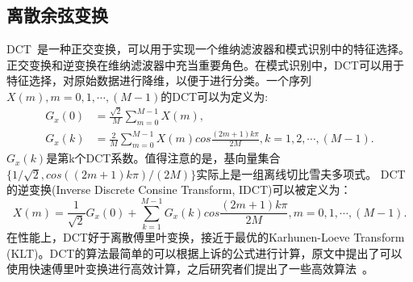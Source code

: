 \subsection{离散余弦变换}
DCT~\cite{ahmed1974discrete}是一种正交变换，可以用于实现一个维纳滤波器和模式识别中的特征选择。正交变换和逆变换在维纳滤波器中充当重要角色。在模式识别中，DCT可以用于特征选择，对原始数据进行降维，以便于进行分类。一个序列$X(m),m=0,1,\cdots,(M-1)$的DCT可以为定义为:
\begin{equation}
\label{equ:dct}
\begin{aligned}
G_{x}\left( 0\right) &= \frac{\sqrt{2}}{M} \sum_{m=0}^{M-1}X\left( m\right), \\
G_{x}\left( k\right) &= \frac{2}{M} \sum_{m=0}^{M-1}X\left( m\right)cos\frac{\left(2m+1\right)k\pi}{2M}, k=1,2,\cdots,(M-1).
\end{aligned}
\end{equation}
$G_{x}(k)$是第k个DCT系数。值得注意的是，基向量集合$\{ 1/\sqrt{2}, cos((2m+1)k\pi)/(2M) \}$实际上是一组离线切比雪夫多项式。
DCT的逆变换(Inverse Discrete Consine Transform, IDCT)可以被定义为：
\begin{equation}
\label{equ:idct}
X(m) = \frac{1}{\sqrt{2}}G_{x}(0) + \sum_{k=1}^{M-1}G_{x}(k)cos\frac{(2m+1)k\pi}{2M}, m=0,1,\cdots,(M-1). 
\end{equation}
在性能上，DCT好于离散傅里叶变换，接近于最优的Karhunen-Loeve Transform (KLT)。DCT的算法最简单的可以根据上诉的公式进行计算，原文\cite{ahmed1974discrete}中提出了可以使用快速傅里叶变换进行高效计算，之后研究者们提出了一些高效算法~\cite{winograd1978computing,lee1984new,hou1987fast}。

